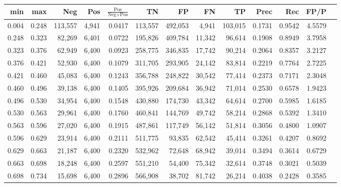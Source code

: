 \begin{tabular}{rrrrrrrrrrrrr}
\toprule
  min &   max &     Neg &   Pos & $\frac{\text{Pos}}{\text{Neg}+\text{Pos}}$ &      TN &      FP &      FN &      TP &   Prec &    Rec &   FP/P \\
\midrule
0.004 & 0.248 & 113,557 & 4,941 &                                     0.0417 & 113,557 & 492,053 &   4,941 & 103,015 & 0.1731 & 0.9542 & 4.5579 \\
0.248 & 0.323 &  82,269 & 6,401 &                                     0.0722 & 195,826 & 409,784 &  11,342 &  96,614 & 0.1908 & 0.8949 & 3.7958 \\
0.323 & 0.376 &  62,949 & 6,400 &                                     0.0923 & 258,775 & 346,835 &  17,742 &  90,214 & 0.2064 & 0.8357 & 3.2127 \\
0.376 & 0.421 &  52,930 & 6,400 &                                     0.1079 & 311,705 & 293,905 &  24,142 &  83,814 & 0.2219 & 0.7764 & 2.7225 \\
0.421 & 0.460 &  45,083 & 6,400 &                                     0.1243 & 356,788 & 248,822 &  30,542 &  77,414 & 0.2373 & 0.7171 & 2.3048 \\
0.460 & 0.496 &  39,138 & 6,400 &                                     0.1405 & 395,926 & 209,684 &  36,942 &  71,014 & 0.2530 & 0.6578 & 1.9423 \\
0.496 & 0.530 &  34,954 & 6,400 &                                     0.1548 & 430,880 & 174,730 &  43,342 &  64,614 & 0.2700 & 0.5985 & 1.6185 \\
0.530 & 0.563 &  29,961 & 6,400 &                                     0.1760 & 460,841 & 144,769 &  49,742 &  58,214 & 0.2868 & 0.5392 & 1.3410 \\
0.563 & 0.596 &  27,020 & 6,400 &                                     0.1915 & 487,861 & 117,749 &  56,142 &  51,814 & 0.3056 & 0.4800 & 1.0907 \\
0.596 & 0.629 &  23,914 & 6,400 &                                     0.2111 & 511,775 &  93,835 &  62,542 &  45,414 & 0.3261 & 0.4207 & 0.8692 \\
0.629 & 0.663 &  21,187 & 6,400 &                                     0.2320 & 532,962 &  72,648 &  68,942 &  39,014 & 0.3494 & 0.3614 & 0.6729 \\
0.663 & 0.698 &  18,248 & 6,400 &                                     0.2597 & 551,210 &  54,400 &  75,342 &  32,614 & 0.3748 & 0.3021 & 0.5039 \\
0.698 & 0.734 &  15,698 & 6,400 &                                     0.2896 & 566,908 &  38,702 &  81,742 &  26,214 & 0.4038 & 0.2428 & 0.3585 \\

\end{tabular}
